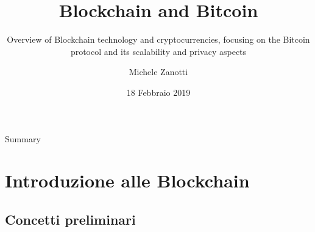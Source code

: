 \documentclass{beamer}
\title{Blockchain and Bitcoin}
\subtitle[]{Overview of Blockchain technology and cryptocurrencies, focusing on
the Bitcoin protocol and its scalability and privacy aspects}
\institute[]{Università degli studi di Brescia}
\author{Michele Zanotti}
\date{18 Febbraio 2019}
\begin{document}
  \begin{frame}
    \titlepage
  \end{frame}
  \begin{frame}{Summary}
    \frametitle{\contentsname}
    \begin{multicols}{2}
        \tableofcontents
    \end{multicols}
  \end{frame}





  \section{Introduzione alle Blockchain}
  \subsection{Concetti preliminari}





\end{document}
